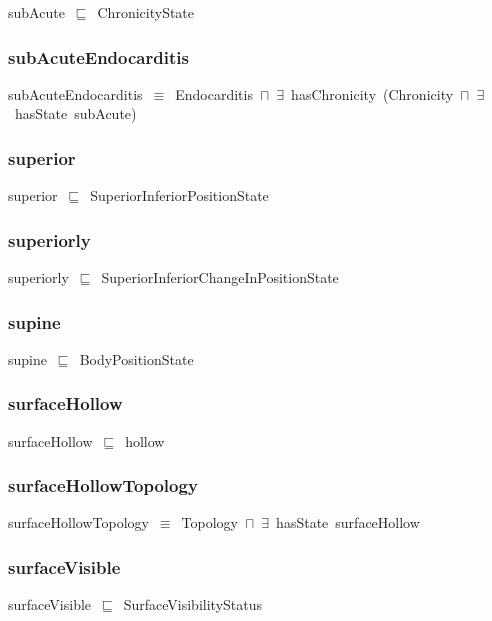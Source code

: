 \documentclass{article}
\begin{document}
subAcute~\ensuremath{\sqsubseteq}~ChronicityState~

\subsubsection*{subAcuteEndocarditis}

subAcuteEndocarditis~\ensuremath{\equiv}~Endocarditis~\ensuremath{\sqcap}~\ensuremath{\exists}~hasChronicity~(Chronicity~\ensuremath{\sqcap}~\ensuremath{\exists}~hasState~subAcute)

\subsubsection*{superior}

superior~\ensuremath{\sqsubseteq}~SuperiorInferiorPositionState~

\subsubsection*{superiorly}

superiorly~\ensuremath{\sqsubseteq}~SuperiorInferiorChangeInPositionState~

\subsubsection*{supine}

supine~\ensuremath{\sqsubseteq}~BodyPositionState~

\subsubsection*{surfaceHollow}

surfaceHollow~\ensuremath{\sqsubseteq}~hollow~

\subsubsection*{surfaceHollowTopology}

surfaceHollowTopology~\ensuremath{\equiv}~Topology~\ensuremath{\sqcap}~\ensuremath{\exists}~hasState~surfaceHollow

\subsubsection*{surfaceVisible}

surfaceVisible~\ensuremath{\sqsubseteq}~SurfaceVisibilityStatus~
\end{document}
